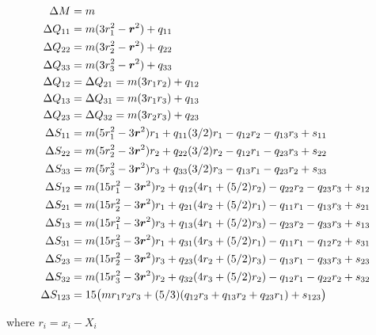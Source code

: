 \begin{align}
\Delta M &= m \\
\Delta Q_{11} &= m (3 r_1^2 - \boldsymbol{r}^2) + q_{11} \\
\Delta Q_{22} &= m (3 r_2^2 - \boldsymbol{r}^2) + q_{22} \\
\Delta Q_{33} &= m (3 r_3^2 - \boldsymbol{r}^2) + q_{33} \\
\Delta Q_{12} &= \Delta Q_{21} = m ( 3 r_1 r_2 ) + q_{12}\\
\Delta Q_{13} &= \Delta Q_{31} = m ( 3 r_1 r_3 ) + q_{13}\\
\Delta Q_{23} &= \Delta Q_{32} = m ( 3 r_2 r_3 ) + q_{23}\\
\Delta S_{11} &= m ( 5 r_1^2 - 3 \boldsymbol{r}^2 ) r_1 + q_{11} (3/2) r_1 - q_{12} r_2 - q_{13} r_3 + s_{11} \\
\Delta S_{22} &= m ( 5 r_2^2 - 3 \boldsymbol{r}^2 ) r_2 + q_{22} (3/2) r_2 - q_{12} r_1 - q_{23} r_3 + s_{22} \\
\Delta S_{33} &= m ( 5 r_3^2 - 3 \boldsymbol{r}^2 ) r_3 + q_{33} (3/2) r_3 - q_{13} r_1 - q_{23} r_2 + s_{33} \\
\Delta S_{12} &= m ( 15 r_1^2 - 3 \boldsymbol{r}^2 ) r_2 + q_{12} ( 4 r_1 + (5/2) r_2) - q_{22} r_2 - q_{23} r_3 + s_{12} \\
\Delta S_{21} &= m ( 15 r_2^2 - 3 \boldsymbol{r}^2 ) r_1 + q_{21} ( 4 r_2 + (5/2) r_1) - q_{11} r_1 - q_{13} r_3 + s_{21} \\
\Delta S_{13} &= m ( 15 r_1^2 - 3 \boldsymbol{r}^2 ) r_3 + q_{13} ( 4 r_1 + (5/2) r_3) - q_{23} r_2 - q_{33} r_3 + s_{13} \\
\Delta S_{31} &= m ( 15 r_3^2 - 3 \boldsymbol{r}^2 ) r_1 + q_{31} ( 4 r_3 + (5/2) r_1) - q_{11} r_1 - q_{12} r_2 + s_{31} \\
\Delta S_{23} &= m ( 15 r_2^2 - 3 \boldsymbol{r}^2 ) r_3 + q_{23} ( 4 r_2 + (5/2) r_3) - q_{13} r_1 - q_{33} r_3 + s_{23} \\
\Delta S_{32} &= m ( 15 r_3^2 - 3 \boldsymbol{r}^2 ) r_2 + q_{32} ( 4 r_3 + (5/2) r_2) - q_{12} r_1 - q_{22} r_2 + s_{32} \\
\Delta S_{123} &=15 \big( m r_1 r_2 r_3 + (5 / 3) ( q_{12}  r_3 + q_{13} r_2 + q_{23} r_1) + s_{123} \big)
\end{align}

where $r_i = x_i - X_i$